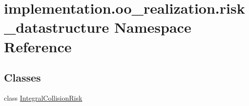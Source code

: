 \hypertarget{namespaceimplementation_1_1oo__realization_1_1risk__datastructure}{}\section{implementation.\+oo\+\_\+realization.\+risk\+\_\+datastructure Namespace Reference}
\label{namespaceimplementation_1_1oo__realization_1_1risk__datastructure}
\subsection*{Classes}
\begin{DoxyCompactItemize}
\item 
class \hyperlink{classimplementation_1_1oo__realization_1_1risk__datastructure_1_1_integral_collision_risk}{Integral\+Collision\+Risk}
\end{DoxyCompactItemize}

